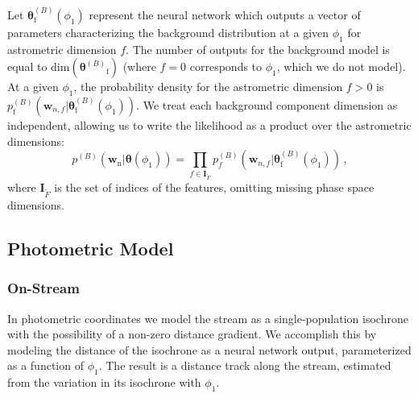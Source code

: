 \documentclass[twocolumn]{aastex631}
\newcommand{\mrm}[1]{\mathrm{#1}}
\newcommand{\mbs}[1]{\boldsymbol{#1}}
\newcommand{\pdf}{p}
\newcommand{\nth}[1]{{#1}_{\mrm{n}}}  %
\newcommand{\fth}[1]{{#1}_{\mrm{f}}}  %
\newcommand{\smallcomponent}[2]{#2^{\scriptscriptstyle (#1)}}
\newcommand{\cmp}[2]{\smallcomponent{#1}{#2}}
\newcommand{\Bcmp}[1]{\cmp{B}{#1}}
\begin{document}
            Let $\Bcmp{\fth{\mbs{\theta}}}(\phi_1)$ represent the neural network
            which outputs a vector of parameters characterizing the background
            distribution at a given $\phi_1$ for astrometric dimension $f$. The
            number of outputs for the background model is equal to
            $\mathrm{dim}\left(\fth{\Bcmp{\mbs{\theta}}}\right)$ (where $f=0$
            corresponds to $\phi_1$, which we do not model). At a given
            $\phi_1$, the probability density for the astrometric dimension
            $f>0$ is $\Bcmp{\fth{\pdf}}\left(\mbs{w}_{n,f} |
            \Bcmp{\fth{\mbs{\theta}}}(\phi_1) \right)$. We treat each background
            component dimension as independent, allowing us to write the
            likelihood as a product over the astrometric dimensions:
            \begin{equation} \label{eq:astrometric_model_off_stream_probability}
                \pdf^{(B)}\left(\nth{\mbs{w}} | \mbs{\theta}(\phi_1) \right) = \prod_{f\in \mbs{I}_{\tilde{F}}} \pdf_f^{(B)}\left(\mbs{w}_{n,f} | \Bcmp{\fth{\mbs{\theta}}}(\phi_1) \right)\,,
            \end{equation}
            where $\mbs{I}_{\tilde{F}}$ is the set of indices of the features,
            omitting missing phase space dimensions.
        


    \subsection{Photometric Model} \label{sub:method:photometric_model}

        \subsubsection{On-Stream} \label{ssub:method:photometric_model:on_stream}

            In photometric coordinates we model the stream as a
            single-population isochrone with the possibility of a non-zero
            distance gradient. We accomplish this by modeling the distance of
            the isochrone as a neural network output, parameterized as a
            function of $\phi_1$. The result is a distance track along the
            stream, estimated from the variation in its isochrone with $\phi_1$. 
            
\end{document}
